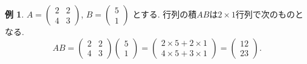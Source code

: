 \documentclass[dvipdfmx,a4paper,11pt]{article}
\theoremstyle{definition}
\newtheorem{exa}[thm]{例}
\begin{document}
  \begin{exa}
 $ A= 
 \begin{pmatrix}
2 & 2\\
4 & 3
 \end{pmatrix}
 $, $
 B = 
 \begin{pmatrix}
5 \\1
 \end{pmatrix}
 $
 とする. 
 行列の積$AB$は$2 \times 1$行列で次のものとなる.  
 $$
 AB = 
 \begin{pmatrix}
2 & 2\\
4 & 3
 \end{pmatrix}
  \begin{pmatrix}
5 \\1
 \end{pmatrix}
 =  
 \begin{pmatrix}
2\times 5 + 2\times 1 \\
4 \times 5 + 3 \times 1
 \end{pmatrix}
 = 
  \begin{pmatrix}
12 \\
23
 \end{pmatrix}.
 $$
 
 \end{exa}
 
\end{document}
